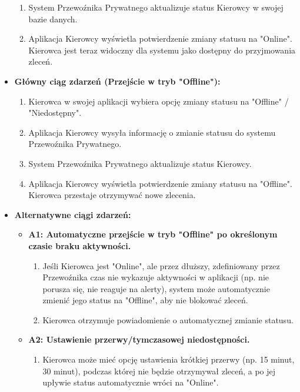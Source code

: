 \documentclass[a4paper,12pt]{article}
\begin{document}
\begin{itemize}
\begin{enumerate}
            \item System Przewoźnika Prywatnego aktualizuje status Kierowcy w swojej bazie danych.
            \item Aplikacja Kierowcy wyświetla potwierdzenie zmiany statusu na "Online". Kierowca jest teraz widoczny dla systemu jako dostępny do przyjmowania zleceń.
        \end{enumerate}
    \item \textbf{Główny ciąg zdarzeń (Przejście w tryb "Offline"):}
        \begin{enumerate}
            \item Kierowca w swojej aplikacji wybiera opcję zmiany statusu na "Offline" / "Niedostępny".
            \item Aplikacja Kierowcy wysyła informację o zmianie statusu do systemu Przewoźnika Prywatnego.
            \item System Przewoźnika Prywatnego aktualizuje status Kierowcy.
            \item Aplikacja Kierowcy wyświetla potwierdzenie zmiany statusu na "Offline". Kierowca przestaje otrzymywać nowe zlecenia.
        \end{enumerate}
    \item \textbf{Alternatywne ciągi zdarzeń:}
        \begin{itemize}
            \item \textbf{A1: Automatyczne przejście w tryb "Offline" po określonym czasie braku aktywności.}
                \begin{enumerate}
                    \item Jeśli Kierowca jest "Online", ale przez dłuższy, zdefiniowany przez Przewoźnika czas nie wykazuje aktywności w aplikacji (np. nie porusza się, nie reaguje na alerty), system może automatycznie zmienić jego status na "Offline", aby nie blokować zleceń.
                    \item Kierowca otrzymuje powiadomienie o automatycznej zmianie statusu.
                \end{enumerate}
            \item \textbf{A2: Ustawienie przerwy/tymczasowej niedostępności.}
                 \begin{enumerate}
                    \item Kierowca może mieć opcję ustawienia krótkiej przerwy (np. 15 minut, 30 minut), podczas której nie będzie otrzymywał zleceń, a po jej upływie status automatycznie wróci na "Online".
                \end{enumerate}

\end{itemize}
\end{itemize}
\end{document}
